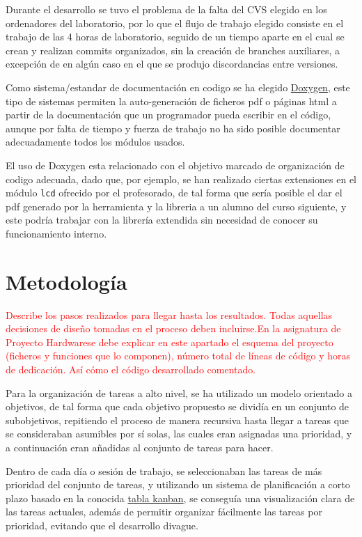 \documentclass[12pt,letterpaper]{article}
\begin{document}
Durante el desarrollo se tuvo el problema de la falta del CVS elegido
en los ordenadores del laboratorio, por lo que el flujo de trabajo
elegido consiste en el trabajo de las 4 horas de laboratorio, seguido
de un tiempo aparte en el cual se crean y realizan commits
organizados, sin la creación de branches auxiliares, a excepción de en
algún caso en el que se produjo discordancias entre versiones.

Como sistema/estandar de documentación en codigo se ha elegido
\href{http://www.stack.nl/~dimitri/doxygen/}{Doxygen}, este tipo de
sistemas permiten la auto-generación de ficheros pdf o páginas html a
partir de la documentación que un programador pueda escribir en el
código, aunque por falta de tiempo y fuerza de trabajo no ha sido
posible documentar adecuadamente todos los módulos usados.

El uso de Doxygen esta relacionado con el objetivo marcado de
organización de codigo adecuada, dado que, por ejemplo, se han
realizado ciertas extensiones en el módulo \texttt{lcd} ofrecido por
el profesorado, de tal forma que sería posible el dar el pdf generado
por la herramienta y la libreria a un alumno del curso siguiente, y
este podría trabajar con la librería extendida sin necesidad de
conocer su funcionamiento interno.

\section{Metodología}
\label{sec:metodologias}
\textcolor{red}{
  Describe los pasos realizados para llegar hasta los
  resultados. Todas aquellas decisiones de diseño tomadas en el proceso
  deben incluirse.En la asignatura de Proyecto Hardwarese debe explicar
  en este apartado el esquema del proyecto (ficheros y funciones que lo
  componen), número total de líneas de código y horas de dedicación. Así
  cómo el código desarrollado comentado.
}

Para la organización de tareas a alto nivel, se ha utilizado un modelo
orientado a objetivos, de tal forma que cada objetivo propuesto se
dividía en un conjunto de subobjetivos, repitiendo el proceso de
manera recursiva hasta llegar a tareas que se consideraban asumibles
por sí solas, las cuales eran asignadas una prioridad, y a
continuación eran añadidas al conjunto de tareas para hacer.

Dentro de cada día o sesión de trabajo, se seleccionaban las tareas de
más prioridad del conjunto de tareas, y utilizando un sistema de
planificación a corto plazo basado en la conocida
\href{https://en.wikipedia.org/wiki/Kanban\_board}{tabla kanban}, se
conseguía una visualización clara de las tareas actuales, además de
permitir organizar fácilmente las tareas por prioridad, evitando que
el desarrollo divague.
\end{document}
